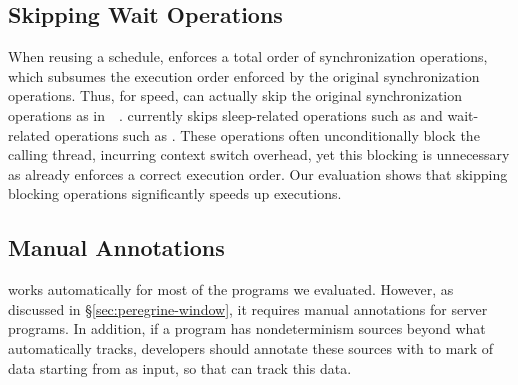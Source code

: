 \subsection{Skipping Wait Operations} \label{sec:peregrine-nowait}

When reusing a schedule, \peregrine enforces a total order of synchronization
operations, which subsumes the execution order enforced by the original
synchronization operations.  Thus, for speed, \peregrine can actually skip the
original synchronization operations as in~~\cite{cui:tern:osdi10}.
\peregrine currently skips sleep-related operations
such as  and wait-related operations such as
.  These operations often unconditionally block
the calling thread, incurring context switch overhead, yet this blocking
is unnecessary as \peregrine already enforces a correct execution order.  Our
evaluation shows that skipping blocking operations significantly speeds
up executions.

\subsection{Manual Annotations} \label{sec:peregrine-func-summary}

\peregrine works automatically for most of the programs we evaluated.  However,
as discussed in \S\ref{sec:peregrine-window}, it requires manual annotations for
server programs.  In addition, if a program has nondeterminism sources
beyond what \peregrine automatically tracks, developers should annotate these
sources with  to mark  of
data starting from  as input, so that \peregrine can track this
data.

